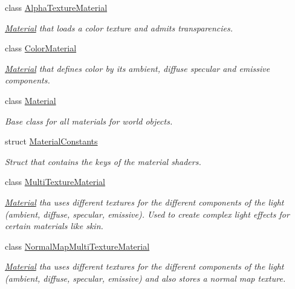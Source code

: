 \begin{DoxyCompactItemize}
class \mbox{\hyperlink{class_geometry_engine_1_1_geometry_material_1_1_alpha_texture_material}{Alpha\+Texture\+Material}}
\begin{DoxyCompactList}\small\item\em \mbox{\hyperlink{class_geometry_engine_1_1_geometry_material_1_1_material}{Material}} that loads a color texture and admits transparencies. \end{DoxyCompactList}\item 
class \mbox{\hyperlink{class_geometry_engine_1_1_geometry_material_1_1_color_material}{Color\+Material}}
\begin{DoxyCompactList}\small\item\em \mbox{\hyperlink{class_geometry_engine_1_1_geometry_material_1_1_material}{Material}} that defines color by its ambient, diffuse specular and emissive components. \end{DoxyCompactList}\item 
class \mbox{\hyperlink{class_geometry_engine_1_1_geometry_material_1_1_material}{Material}}
\begin{DoxyCompactList}\small\item\em Base class for all materials for world objects. \end{DoxyCompactList}\item 
struct \mbox{\hyperlink{struct_geometry_engine_1_1_geometry_material_1_1_material_constants}{Material\+Constants}}
\begin{DoxyCompactList}\small\item\em Struct that contains the keys of the material shaders. \end{DoxyCompactList}\item 
class \mbox{\hyperlink{class_geometry_engine_1_1_geometry_material_1_1_multi_texture_material}{Multi\+Texture\+Material}}
\begin{DoxyCompactList}\small\item\em \mbox{\hyperlink{class_geometry_engine_1_1_geometry_material_1_1_material}{Material}} tha uses different textures for the different components of the light (ambient, diffuse, specular, emissive). Used to create complex light effects for certain materials like skin. \end{DoxyCompactList}\item 
class \mbox{\hyperlink{class_geometry_engine_1_1_geometry_material_1_1_normal_map_multi_texture_material}{Normal\+Map\+Multi\+Texture\+Material}}
\begin{DoxyCompactList}\small\item\em \mbox{\hyperlink{class_geometry_engine_1_1_geometry_material_1_1_material}{Material}} tha uses different textures for the different components of the light (ambient, diffuse, specular, emissive) and also stores a normal map texture. \end{DoxyCompactList}\item 

\end{DoxyCompactItemize}

